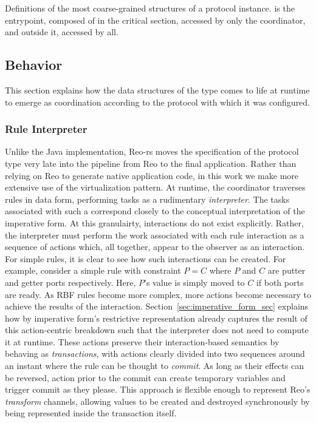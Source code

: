 \begin{listing}[ht]
	\centering
	\inputminted{rust}{proto.rs}
	\caption[Proto type with parts inside and outside the lock.]{Definitions of the most coarse-grained structures of a protocol instance.  is the entrypoint, composed of  in the critical section, accessed by only the coordinator, and  outside it, accessed by all.}
	\label{listing:proto}
\end{listing}


\subsection{Behavior}
\label{sec:behavior_implementation}
This section explains how the data structures of the  type comes to life at runtime to emerge as coordination according to the protocol with which it was configured. 

\subsubsection{Rule Interpreter}
Unlike the Java implementation, Reo-rs moves the specification of the protocol type very late into the pipeline from Reo to the final application. Rather than relying on Reo to generate native application code, in this work we make more extensive use of the virtualization pattern. At runtime, the coordinator traverses rules in data form, performing tasks as a rudimentary \textit{interpreter}. The tasks associated with such a  correspond closely to the conceptual interpretation of the imperative form. At this granulairty, interactions do not exist explicitly. Rather, the interpreter must perform the work associated with each rule interaction as a sequence of actions which, all together, appear to the observer as an interaction. For simple rules, it is clear to see how such interactions can be created. For example, consider a simple rule with constraint $P=C$ where $P$ and $C$ are putter and getter ports respectively. Here, $P$'s value is simply moved to $C$ if both ports are ready. As RBF rules become more complex, more actions become necessary to achieve the results of the interaction. Section~\ref{sec:imperative_form_sec} explains how by imperative form's restrictive representation already captures the result of this action-centric breakdown such that the interpreter does not need to compute it at runtime. These actions preserve their interaction-based semantics by behaving as \textit{transactions}, with actions clearly divided into two sequences around an instant where the rule can be thought to \textit{commit}. As long as their effects can be reversed, action prior to the commit can create temporary variables and trigger commit as they please. This approach is flexible enough to represent Reo's \textit{transform} channels, allowing values to be created and destroyed synchronously by being represented inside the transaction itself. 


